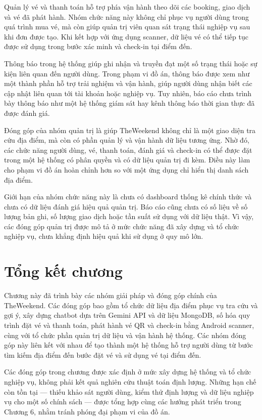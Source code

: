 \documentclass[../DoAn.tex]{subfiles}
\begin{document}
Quản lý vé và thanh toán hỗ trợ phía vận hành theo dõi các booking, giao dịch và vé đã phát hành. Nhóm chức năng này không chỉ phục vụ người dùng trong quá trình mua vé, mà còn giúp quản trị viên quan sát trạng thái nghiệp vụ sau khi đơn được tạo. Khi kết hợp với ứng dụng scanner, dữ liệu vé có thể tiếp tục được sử dụng trong bước xác minh và check-in tại điểm đến.

Thông báo trong hệ thống giúp ghi nhận và truyền đạt một số trạng thái hoặc sự kiện liên quan đến người dùng. Trong phạm vi đồ án, thông báo được xem như một thành phần hỗ trợ trải nghiệm và vận hành, giúp người dùng nhận biết các cập nhật liên quan tới tài khoản hoặc nghiệp vụ. Tuy nhiên, báo cáo chưa trình bày thông báo như một hệ thống giám sát hay kênh thông báo thời gian thực đã được đánh giá.

Đóng góp của nhóm quản trị là giúp TheWeekend không chỉ là một giao diện tra cứu địa điểm, mà còn có phần quản lý và vận hành dữ liệu tương ứng. Nhờ đó, các chức năng người dùng, vé, thanh toán, đánh giá và check-in có thể được đặt trong một hệ thống có phân quyền và có dữ liệu quản trị đi kèm. Điều này làm cho phạm vi đồ án hoàn chỉnh hơn so với một ứng dụng chỉ hiển thị danh sách địa điểm.

Giới hạn của nhóm chức năng này là chưa có dashboard thống kê chính thức và chưa có dữ liệu đánh giá hiệu quả quản trị. Báo cáo cũng chưa có số liệu về số lượng bản ghi, số lượng giao dịch hoặc tần suất sử dụng với dữ liệu thật. Vì vậy, các đóng góp quản trị được mô tả ở mức chức năng đã xây dựng và tổ chức nghiệp vụ, chưa khẳng định hiệu quả khi sử dụng ở quy mô lớn.

\section{Tổng kết chương}

Chương này đã trình bày các nhóm giải pháp và đóng góp chính của TheWeekend. Các đóng góp bao gồm tổ chức dữ liệu địa điểm phục vụ tra cứu và gợi ý, xây dựng chatbot dựa trên Gemini API và dữ liệu MongoDB, số hóa quy trình đặt vé và thanh toán, phát hành vé QR và check-in bằng Android scanner, cùng với tổ chức phần quản trị dữ liệu và vận hành hệ thống. Các nhóm đóng góp này liên kết với nhau để tạo thành một hệ thống hỗ trợ người dùng từ bước tìm kiếm địa điểm đến bước đặt vé và sử dụng vé tại điểm đến.

Các đóng góp trong chương được xác định ở mức xây dựng hệ thống và tổ chức nghiệp vụ, không phải kết quả nghiên cứu thuật toán định lượng. Những hạn chế còn tồn tại — thiếu khảo sát người dùng, kiểm thử định lượng và dữ liệu nghiệp vụ cho một số chính sách — được tổng hợp cùng các hướng phát triển trong Chương 6, nhằm tránh phóng đại phạm vi của đồ án.
\end{document}
